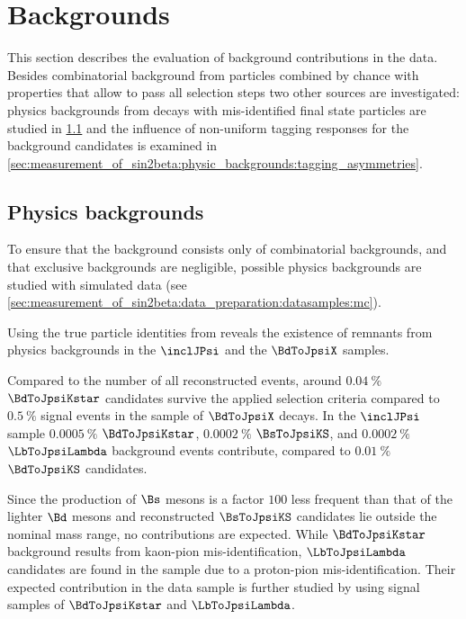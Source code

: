 
\section{Backgrounds}
\label{sec:measurement_of_sin2beta:physic_backgrounds}

This section describes the evaluation of background contributions in the data.
Besides combinatorial background from particles combined by chance with
properties that allow to pass all selection steps two other sources are
investigated: physics backgrounds from decays with mis-identified final state
particles are studied in
\cref{sec:measurement_of_sin2beta:physic_backgrounds:physic_backgrounds} and the
influence of non-uniform tagging responses for the background candidates is
examined in
\cref{sec:measurement_of_sin2beta:physic_backgrounds:tagging_asymmetries}.

\subsection{Physics backgrounds}
\label{sec:measurement_of_sin2beta:physic_backgrounds:physic_backgrounds}

To ensure that the background consists only of combinatorial backgrounds, and
that exclusive backgrounds are negligible, possible physics backgrounds are
studied with simulated data (see
\cref{sec:measurement_of_sin2beta:data_preparation:datasamples:mc}).

Using the true particle identities from \MC reveals the existence of remnants
from physics backgrounds in the $\inclJPsi$ and the $\BdToJpsiX$ \MC samples.

Compared to the number of all reconstructed events, around $\SI{0.04}{\percent}$
$\BdToJpsiKstar$ candidates survive the applied selection criteria compared to
$\SI{0.5}{\percent}$ signal events in the sample of $\BdToJpsiX$ decays. In the
$\inclJPsi$ sample $\SI{0.0005}{\percent}$ $\BdToJpsiKstar$,
$\SI{0.0002}{\percent}$ $\BsToJpsiKS$, and $\SI{0.0002}{\percent}$
$\LbToJpsiLambda$ background events contribute, compared to
$\SI{0.01}{\percent}$ $\BdToJpsiKS$ candidates.

Since the production of $\Bs$ mesons is a factor $\num{100}$ less frequent than
that of the lighter $\Bd$ mesons and reconstructed $\BsToJpsiKS$ candidates lie
outside the nominal mass range, no contributions are expected. While
$\BdToJpsiKstar$ background results from kaon-pion mis-identification,
$\LbToJpsiLambda$ candidates are found in the sample due to a proton-pion
mis-identification. Their expected contribution in the data sample is further
studied by using signal \MC samples of $\BdToJpsiKstar$ and $\LbToJpsiLambda$.

